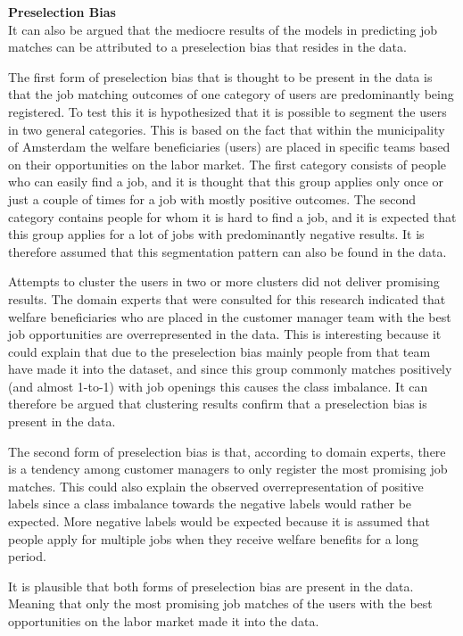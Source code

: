 \noindent
\textbf{Preselection Bias} \\
It can also be argued that the mediocre results of the models in predicting job matches can be attributed to a preselection bias that resides in the data. 

The first form of preselection bias that is thought to be present in the data is that the job matching outcomes of one category of users are predominantly being registered.
To test this it is hypothesized that it is possible to segment the users in two general categories.
This is based on the fact that within the municipality of Amsterdam the welfare beneficiaries (users) are placed in specific teams based on their opportunities on the labor market. 
The first category consists of people who can easily find a job, and it is thought that this group applies only once or just a couple of times for a job with mostly positive outcomes. 
The second category contains people for whom it is hard to find a job, and it is expected that this group applies for a lot of jobs with predominantly negative results.
It is therefore assumed that this segmentation pattern can also be found in the data.

Attempts to cluster the users in two or more clusters did not deliver promising results.
The domain experts that were consulted for this research indicated that welfare beneficiaries who are placed in the customer manager team with the best job opportunities are overrepresented in the data.  
This is interesting because it could explain that due to the preselection bias mainly people from that team have made it into the dataset, and since this group commonly matches positively (and almost 1-to-1) with job openings this causes the class imbalance.
It can therefore be argued that clustering results confirm that a preselection bias is present in the data. 

The second form of preselection bias is that, according to domain experts, there is a tendency among customer managers to only register the most promising job matches.
This could also explain the observed overrepresentation of positive labels since a class imbalance towards the negative labels would rather be expected.
More negative labels would be expected because it is assumed that people apply for multiple jobs when they receive welfare benefits for a long period. 

It is plausible that both forms of preselection bias are present in the data.
Meaning that only the most promising job matches of the users with the best opportunities on the labor market made it into the data.

